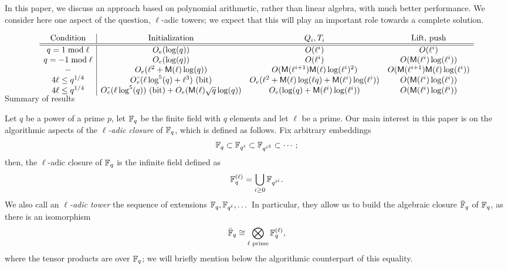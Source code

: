 \documentclass{sig-alternate}
\begin{document}
In this paper, we discuss an approach based on polynomial arithmetic,
rather than linear algebra, with much better performance. We consider
here one aspect of the question, $\ell$-adic towers; we expect that
this will play an important role towards a complete solution.

\begin{table*}[!t]
$$
\begin{array}{c|cccc}
  \text{Condition} & \text{Initialization} & Q_i, T_i & \text{Lift, push}\\
  \hline \hline
  q = 1 \bmod \ell & O_e(\log(q))  & O(\ell^i) & O(\ell^i) \\
  q = -1 \bmod \ell & O_e(\log(q)) & O(\ell^i) & O(\Mult(\ell^i) \log(\ell^i)) \\
  - & O_e (\ell^2+\Mult(\ell) \log(q)) & O(\Mult(\ell^{i+1})\Mult(\ell)\log(\ell^i)^2) & O( \Mult(\ell^{i+1})\Mult(\ell)\log(\ell^i))\\
  4\ell \le q^{1/4} & O\tilde{_e}(\ell\log^5(q)+\ell^3) \text{~(bit)}  & O_e(\ell^2+\Mult(\ell)\log(\ell
  q)+\Mult(\ell^i)\log(\ell^i)) & O(\Mult(\ell^i) \log(\ell^i)) \\
  4\ell \le q^{1/4} & O\tilde{_e}(\ell\log^5(q))  \text{~(bit)}  + O_e(\Mult(\ell)\sqrt{q}\log(q)) & O_e(\log(q) + \Mult(\ell^i) \log(\ell^i)) & O(\Mult(\ell^i) \log(\ell^i)) \vspace{-0.5cm}
\end{array}
$$
\label{table:main}
\caption{Summary of results}
\end{table*}

Let $q$ be a power of a prime $p$, let $\mathbb{F}_q$ be the finite field with
$q$ elements and let $\ell$ be a prime. Our main interest in this
paper is on the algorithmic aspects of the \emph{$\ell$-adic closure}
of $\mathbb{F}_q$, which is defined as follows. Fix arbitrary embeddings
\begin{equation*}
  \mathbb{F}_q \subset \mathbb{F}_{q^\ell} \subset \mathbb{F}_{q^{\ell^2}} \subset \cdots;
\end{equation*}
then, the $\ell$-adic closure of $\mathbb{F}_q$ is the infinite field defined as
\begin{equation*}
  \mathbb{F}_q^{(\ell)} = \bigcup_{i\ge 0}\mathbb{F}_{q^{\ell^i}}.
\end{equation*}
We also call an \emph{$\ell$-adic tower} the sequence of extensions
$\mathbb{F}_q,\mathbb{F}_{q^\ell},\dots$ In particular, they allow us to build the
algebraic closure $\bar{\mathbb{F}}_q$ of $\mathbb{F}_q$, as there is an isomorphism
\begin{equation}
  \label{eq:tensor}
  \bar{\mathbb{F}}_q \cong \bigotimes_{\ell\text{ prime}} \mathbb{F}_q^{(\ell)},
\end{equation}
where the tensor products are over $\mathbb{F}_q$; we will briefly mention
below the algorithmic counterpart of this equality.
\end{document}

